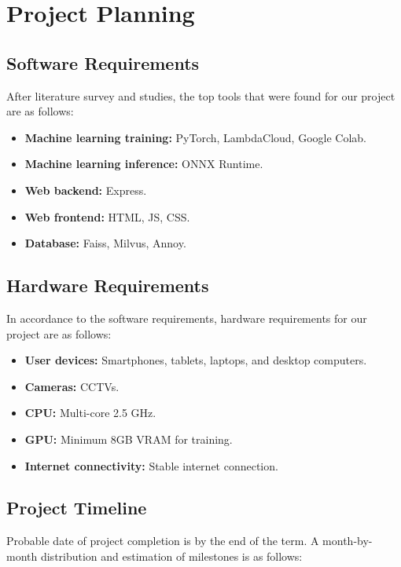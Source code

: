\chapter{Project Planning}

\section{Software Requirements}
	After literature survey and studies, the top tools that were found for our project are as follows:

	\begin{itemize}
		\item \textbf{Machine learning training:} PyTorch, LambdaCloud, Google Colab.
		\item \textbf{Machine learning inference:} ONNX Runtime.
		\item \textbf{Web backend:} Express.
		\item \textbf{Web frontend:} HTML, JS, CSS.
		\item \textbf{Database:} Faiss, Milvus, Annoy.
	\end{itemize}

\section{Hardware Requirements}
	In accordance to the software requirements, hardware requirements for our project are as follows:

	\begin{itemize}
		\item \textbf{User devices:} Smartphones, tablets, laptops, and desktop computers.
		\item \textbf{Cameras:} CCTVs.
		\item \textbf{CPU:} Multi-core 2.5 GHz.
		\item \textbf{GPU:} Minimum 8GB VRAM for training.
		\item \textbf{Internet connectivity:} Stable internet connection.
	\end{itemize}

\section{Project Timeline}
	Probable date of project completion is by the end of the term. A month-by-month distribution and estimation of milestones is as follows:

